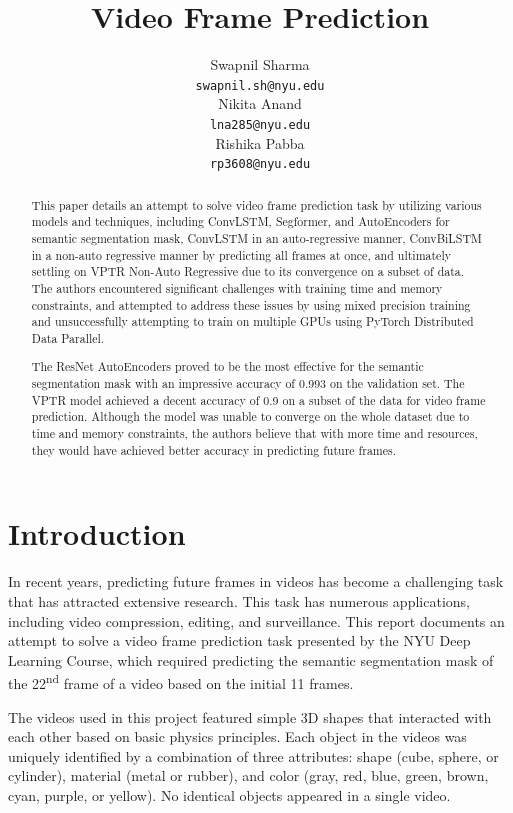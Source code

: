 \documentclass{article}
\title{Video Frame Prediction}
\author{%
  Swapnil Sharma \\
  \texttt{swapnil.sh@nyu.edu} \\
  \And
  Nikita Anand \\
  \texttt{lna285@nyu.edu} \\
  \And
  Rishika Pabba \\
  \texttt{rp3608@nyu.edu} \\
}
\begin{document}
\maketitle


\begin{abstract}
  This paper details an attempt to solve video frame prediction task by utilizing various 
models and techniques, including ConvLSTM, Segformer, and AutoEncoders for semantic segmentation 
mask, ConvLSTM in an auto-regressive manner, ConvBiLSTM in a non-auto regressive manner by 
predicting all frames at once, and ultimately settling on VPTR Non-Auto Regressive due to its 
convergence on a subset of data. The authors encountered significant challenges with training 
time and memory constraints, and attempted to address these issues by using mixed precision 
training and unsuccessfully attempting to train on multiple GPUs using PyTorch Distributed Data 
Parallel.

The ResNet AutoEncoders proved to be the most effective for the semantic segmentation mask with 
an impressive accuracy of 0.993 on the validation set. The VPTR model achieved a decent accuracy 
of 0.9 on a subset of the data for video frame prediction. Although the model was unable to 
converge on the whole dataset due to time and memory constraints, the authors believe that with 
more time and resources, they would have achieved better accuracy in predicting future frames.
\end{abstract}

\section{Introduction}
In recent years, predicting future frames in videos has become a challenging task that has 
attracted extensive research. This task has numerous applications, including video compression, 
editing, and surveillance. This report documents an attempt to solve a video frame prediction 
task presented by the NYU Deep Learning Course, which required predicting the semantic 
segmentation mask of the 22\textsuperscript{nd} frame of a video based on the initial 11 
frames.

The videos used in this project featured simple 3D shapes that interacted with each other 
based on basic physics principles. Each object in the videos was uniquely identified by a 
combination of three attributes: shape (cube, sphere, or cylinder), material (metal or rubber), 
and color (gray, red, blue, green, brown, cyan, purple, or yellow). No identical objects 
appeared in a single video.
\end{document}
